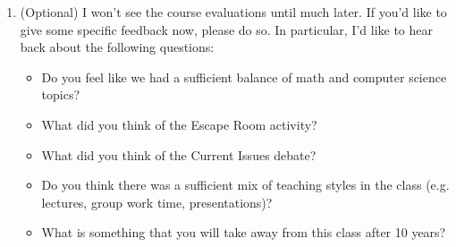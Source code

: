 \documentclass[12pt]{amsart}
\theoremstyle{plain}
\theoremstyle{definition}
\begin{document}
\begin{enumerate}[1.]
	\item (Optional) I won't see the course evaluations until much later.  If you'd like to give some specific feedback now, please do so.  In particular, I'd like to hear back about the following questions:
	\begin{itemize}
		\item Do you feel like we had a sufficient balance of math and computer science topics?
		\item What did you think of the Escape Room activity?
		\item What did you think of the Current Issues debate?
		\item Do you think there was a sufficient mix of teaching styles in the class (e.g. lectures, group work time, presentations)?
		\item What is something that you will take away from this class after 10 years?
	\end{itemize}	
\end{enumerate}


	
\end{document}
